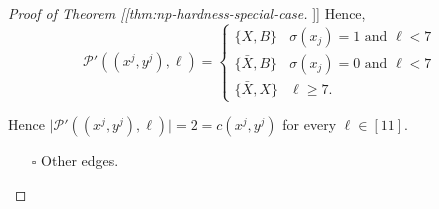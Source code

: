 \documentclass[fontsize=11pt,paper=a4]{book}
\begin{document}
\begin{proof}[Proof of Theorem [[thm:np-hardness-special-case]]]
Hence,
\[\mathcal{P}'((x^j,y^j),\ell)=
\begin{cases}
\{X,B\} & \sigma(x_j)=1\text{ and }\ell<7\\
\{\bar{X},B\} & \sigma(x_j)=0\text{ and }\ell<7\\
\{\bar{X},X\} & \ell\geq 7.
\end{cases}\]

Hence \(\lvert\mathcal{P}'((x^j,y^j),\ell)\rvert=2=c(x^j,y^j)\) for every \(\ell\in[11]\).

\begin{itemize}
\item[{$\square$}] Other edges.
\end{itemize}
\end{proof}
\end{document}
